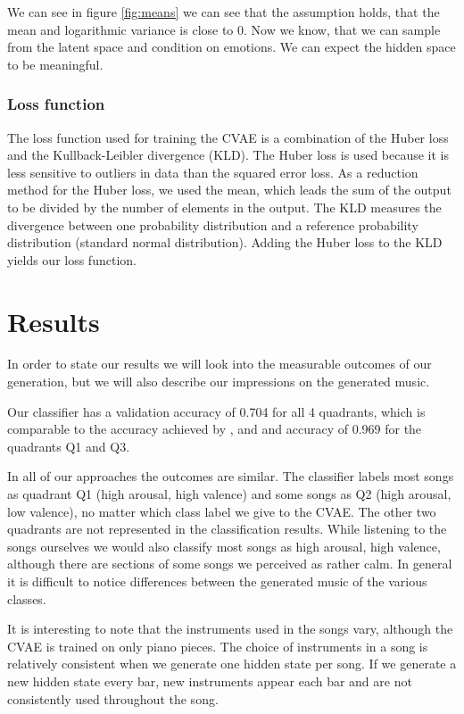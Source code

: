 \documentclass{article}
\begin{document}
We can see in figure \ref{fig:means} we can see that the assumption holds, that the mean and logarithmic variance is close to 0. Now we know, that we can sample from the latent space and condition on emotions. We can expect the hidden space to be meaningful.


\subsubsection{Loss function}
The loss function used for training the CVAE is a combination of the Huber loss and the Kullback-Leibler divergence (KLD). The Huber loss is used because it is less sensitive to outliers in data than the squared error loss. As a reduction method for the Huber loss, we used the mean, which leads the sum of the output to be divided by the number of elements in the output. The KLD measures the divergence between one probability distribution and a reference probability distribution (standard normal distribution). Adding the Huber loss to the KLD yields our loss function.


\section{Results}
In order to state our results we will look into the measurable outcomes of our generation, but we will also describe our impressions on the generated music.

Our classifier has a validation accuracy of 0.704 for all 4 quadrants, which is comparable to the accuracy achieved by \cite{EMOPIA}, and and accuracy of 0.969 for the quadrants Q1 and Q3. 

In all of our approaches the outcomes are similar. The classifier labels most songs as quadrant Q1 (high arousal, high valence) and some songs as Q2 (high arousal, low valence), no matter which class label we give to the CVAE. The other two quadrants are not represented in the classification results. While listening to the songs ourselves we would also classify most songs as high arousal, high valence, although there are sections of some songs we perceived as rather calm. In general it is difficult to notice differences between the generated music of the various classes. 

It is interesting to note that the instruments used in the songs vary, although the CVAE is trained on only piano pieces. The choice of instruments in a song is relatively consistent when we generate one hidden state per song. If we generate a new hidden state every bar, new instruments appear each bar and are not consistently used throughout the song.
\end{document}
